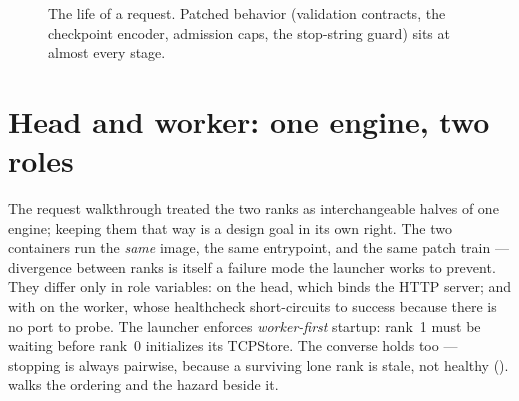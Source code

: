 \begin{figure}[htbp]
\centering
{}
\caption{The life of a request. Patched behavior (validation contracts, the
checkpoint encoder, admission caps, the stop-string guard) sits at almost
every stage.}
\label{fig:architecture:request}
\end{figure}

\section{Head and worker: one engine, two roles}
\label{sec:architecture:roles}

The request walkthrough treated the two ranks as interchangeable halves of
one engine; keeping them that way is a design goal in its own right. The
two containers run the \emph{same} image, the same entrypoint, and the
same patch train --- divergence between ranks is itself a failure mode the
launcher works to prevent. They differ only in role variables:
 on the head, which binds the HTTP server; and
 with  on the worker, whose
healthcheck short-circuits to success because there is no port to probe.
The launcher enforces \emph{worker-first} startup: rank~1 must be waiting
before rank~0 initializes its TCPStore. The converse holds too --- stopping
is always pairwise, because a surviving lone rank is stale, not healthy
().  walks the ordering and
the hazard beside it.

